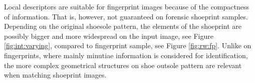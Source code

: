 \documentclass[draft,final]{vutinfth} %
\begin{document}
Local descriptors are suitable for fingerprint images because of the compactness of information.
That is, however, not guaranteed on forensic shoeprint samples.
Depending on the original shoesole pattern, the elements of the shoeprint are possibly bigger and more widespread on the input image, see Figure  \ref{fig:int:varying}, compared to  fingerprint sample, see Figure \ref{fig:rw:fp}.
Unlike on fingerprints, where mainly minutiae information is considered for identification, the more complex geometrical structures on shoe outsole pattern are relevant when matching shoeprint images.

\end{document}
